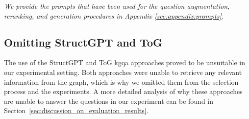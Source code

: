 \textit{We provide the prompts that have been used for the question augmentation, reranking, and generation procedures in Appendix \ref{sec:appendix:prompts}.}

\subsection{Omitting StructGPT and ToG}
\label{sec:selection_planning_omitted_retrievers}

The use of the StructGPT \cite{jiang_structgpt_2023} and ToG \cite{sun_think--graph_2024} \gls{kgqa} approaches proved to be unsuitable in our experimental setting. Both approaches were unable to retrieve any relevant information from the graph, which is why we omitted them from the selection process and the experiments. A more detailed analysis of why these approaches are unable to answer the questions in our experiment can be found in Section~\ref{sec:discussion_on_evaluation_results}. 